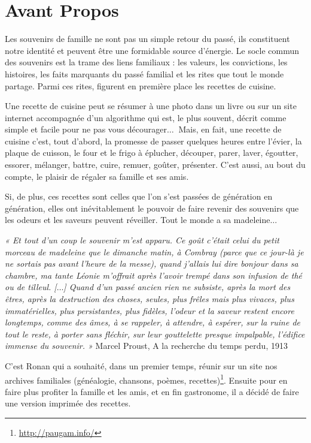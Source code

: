 \section*{Avant Propos}
Les souvenirs de famille ne sont pas un simple retour du passé, ils constituent notre identité et peuvent être une formidable source d’énergie. Le socle commun des souvenirs est la trame des liens familiaux : les valeurs, les convictions, les histoires, les faits marquants du passé familial et les rites que tout le monde partage. Parmi ces rites, figurent en première place les recettes de cuisine.

Une recette de cuisine peut se résumer à une photo dans un livre ou sur un site internet accompagnée d’un algorithme qui est, le plus souvent, décrit comme simple et facile pour ne pas vous décourager$\ldots~$ Mais, en fait, une recette de cuisine c’est, tout d'abord, la promesse de passer quelques heures entre l’évier, la plaque de cuisson, le four et le frigo à éplucher, découper, parer, laver, égoutter, essorer, mélanger, battre, cuire, remuer, goûter, présenter.
C'est aussi, au bout du compte, le plaisir de régaler sa famille et ses amis.

Si, de plus, ces recettes sont celles que l’on s’est passées de génération en génération, elles ont inévitablement le pouvoir de faire revenir des souvenirs que les odeurs et les saveurs peuvent réveiller. Tout le monde a sa madeleine$\ldots$

\textit{« Et tout d'un coup le souvenir m'est apparu. Ce goût c'était celui du petit morceau de madeleine que le dimanche matin, à Combray (parce que ce jour-là je ne sortais pas avant l'heure de la messe), quand j'allais lui dire bonjour dans sa chambre, ma tante Léonie m'offrait après l'avoir trempé dans son infusion de thé ou de tilleul. [$\ldots$] Quand d'un passé ancien rien ne subsiste, après la mort des êtres, après la destruction des choses, seules, plus frêles mais plus vivaces, plus immatérielles, plus persistantes, plus fidèles, l'odeur et la saveur restent encore longtemps, comme des âmes, à se rappeler, à attendre, à espérer, sur la ruine de tout le reste, à porter sans fléchir, sur leur gouttelette presque impalpable, l'édifice immense du souvenir. »} Marcel Proust, A la recherche du temps perdu, 1913

C’est Ronan qui a souhaité, dans un premier temps, réunir sur un site nos archives familiales (généalogie, chansons, poèmes, recettes)\footnote{\url{http://paugam.info/}}. Ensuite pour en faire plus profiter la famille et les amis, et en fin gastronome, il a décidé de faire une version imprimée des recettes.

